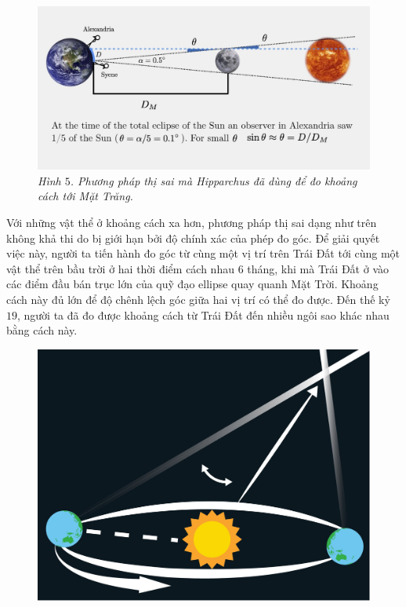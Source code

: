 \begin{multicols}{2}
	\begin{figure}[H]
		\vspace*{-5pt}
		\centering
		\captionsetup{labelformat= empty, justification=centering}
		\includegraphics[width= 1\linewidth]{6}
		\caption{\small\textit{\color{timhieukhoahoc}Hình $5$. Phương pháp thị sai mà Hipparchus đã dùng để đo khoảng cách tới Mặt Trăng.}}
		\vspace*{-5pt}
	\end{figure}
	Với những vật thể ở khoảng cách xa hơn, phương pháp thị sai dạng như trên không khả thi do bị giới hạn bởi độ chính xác của phép đo góc. Để giải quyết việc này, người ta tiến hành đo góc từ cùng một vị trí trên Trái Đất tới cùng một vật thể trên bầu trời ở hai thời điểm cách nhau $6$ tháng, khi mà Trái Đất ở vào các điểm đầu bán trục lớn của quỹ đạo ellipse quay quanh Mặt Trời. Khoảng cách này đủ lớn để độ chênh lệch góc giữa hai vị trí có thể đo được. Đến thế kỷ $19$, người ta đã đo được khoảng cách từ Trái Đất đến nhiều ngôi sao khác nhau bằng cách này.
	\begin{figure}[H]
		\vspace*{-5pt}
		\centering
		\captionsetup{labelformat= empty, justification=centering}
		\includegraphics[width= 1\linewidth]{7}

\end{figure}
\end{multicols}
